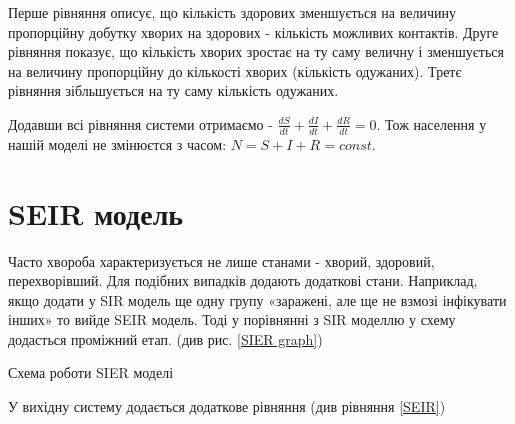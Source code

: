 Перше рівняння описує,
що кількість здорових зменшується на величину 
пропорційну добутку хворих на здорових - кількість можливих контактів. 
Друге рівняння показує, що кількість хворих зростає на ту саму величну і зменшується на величину пропорційну до кількості хворих (кількість одужаних). 
Третє рівняння зібльшується на ту саму кількість одужаних\cite{salimipour_sir_2023}.
\par 
Додавши всі рівняння системи отримаємо - $ \frac{dS}{dt} + \frac{dI}{dt} + \frac{dR}{dt} = 0 $. 
Тож населення у нашій моделі не змінюєтся з часом: $N = S + I + R = const$.


\section{SEIR модель}

Часто хвороба характеризується не лише станами - хворий, здоровий, перехворівший.
Для подібних випадків додають додаткові стани.
Наприклад, якщо додати у SIR модель ще одну групу «заражені, але ще не взмозі інфікувати інших» то вийде SEIR модель. 
Тоді у порівнянні з SIR моделлю у схему додасться проміжний етап. (див рис. \ref{SIER graph})

\begin{risunok}[ht]
    \centering
    \vspace{0.5cm}
    \caption{Схема роботи SIER моделі}
    \label{SIER graph}
\end{risunok}

У вихідну систему додається додаткове рівняння (див рівняння \ref{SEIR})

